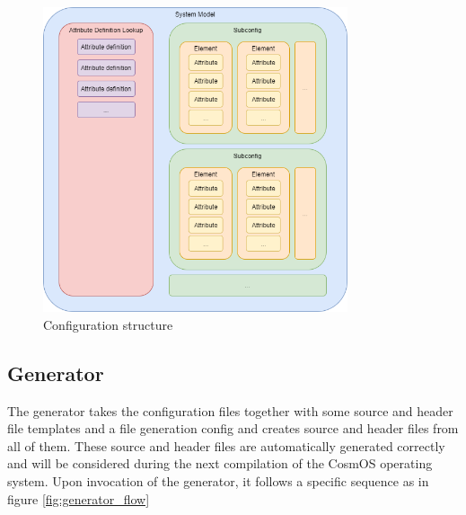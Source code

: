 \begin{figure}[H]
\begin{center}
\includegraphics[width=0.8\textwidth]{images/parser_model_structure}
\caption{Configuration structure}
\label{fig:config_structure}
\end{center}
\end{figure}

\subsection{Generator}
The generator takes the configuration files together with some source and header file templates and a file generation config and creates source and header files from all of them. These source and header files are automatically generated correctly and will be considered during the next compilation of the CosmOS operating system. Upon invocation of the generator, it follows a specific sequence as in figure \ref{fig:generator_flow}

